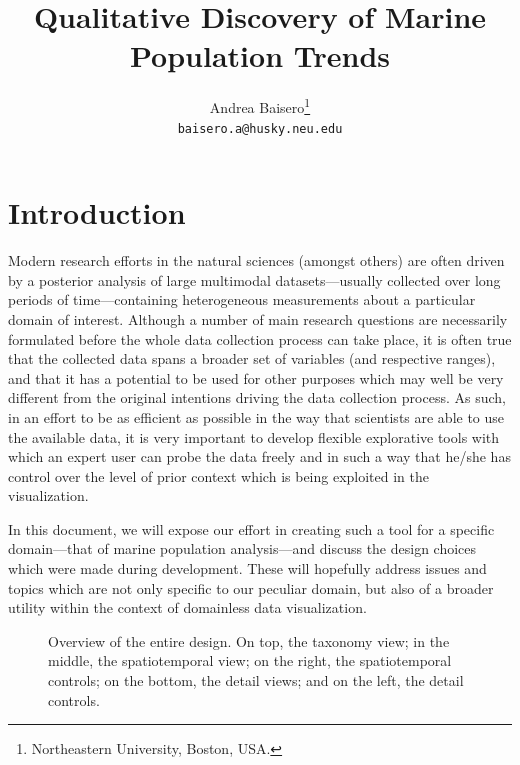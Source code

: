 \documentclass[letterpaper]{article} %
\title{Qualitative Discovery of Marine Population Trends}
\author{Andrea Baisero\thanks{Northeastern University, Boston, USA.}\\\texttt{baisero.a@husky.neu.edu}}
\begin{document}
\maketitle




\section{Introduction}

Modern research efforts in the natural sciences (amongst others) are often
driven by a posterior analysis of large multimodal datasets---usually collected
over long periods of time---containing heterogeneous measurements about
a particular domain of interest.  Although a number of main research questions
are necessarily formulated before the whole data collection process can take
place, it is often true that the collected data spans a broader set of
variables (and respective ranges), and that it has a potential to be used for
other purposes which may well be very different from the original intentions
driving the data collection process.  As such, in an effort to be as efficient
as possible in the way that scientists are able to use the available data, it
is very important to develop flexible explorative tools with which an expert
user can probe the data freely and in such a way that he/she has control over
the level of prior context which is being exploited in the visualization.

In this document, we will expose our effort in creating such a tool for
a specific domain---that of marine population analysis---and discuss the design
choices which were made during development.  These will hopefully address
issues and topics which are not only specific to our peculiar domain, but also
of a broader utility within the context of domainless data visualization.

\begin{figure}
  \centering
  \caption{Overview of the entire design.  On top, the taxonomy view;  in the
  middle, the spatiotemporal view;  on the right, the spatiotemporal controls;
on the bottom, the detail views;  and on the left, the detail controls.}
  \label{fig:full}
\end{figure}
\end{document}

